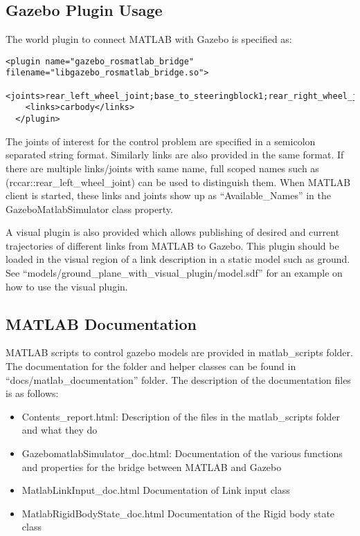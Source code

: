 \documentclass[letterpaper,10pt]{article}
\begin{document}
\subsection{Gazebo Plugin Usage}
The world plugin to connect MATLAB with Gazebo is specified as:
\small
\begin{Verbatim}[frame=single]
 <plugin name="gazebo_rosmatlab_bridge" filename="libgazebo_rosmatlab_bridge.so">
    <joints>rear_left_wheel_joint;base_to_steeringblock1;rear_right_wheel_joint</joints>
    <links>carbody</links>
  </plugin>
\end{Verbatim}
\normalsize
The joints of interest for the control problem are specified in a semicolon separated string format. Similarly links are also provided in the same format. If there are multiple links/joints with same name, full scoped names such as (rccar::rear\_left\_wheel\_joint) can be used to distinguish them. When MATLAB client is started, these links and joints show up as ``Available\_Names'' in the GazeboMatlabSimulator class property.

A visual plugin is also provided which allows publishing of desired and current trajectories of different links from MATLAB to Gazebo. This plugin should be loaded in the visual region of a link description in a static model such as ground. See ``models/ground\_plane\_with\_visual\_plugin/model.sdf'' for an example on how to use the visual plugin.

\subsection{MATLAB Documentation}
MATLAB scripts to control gazebo models are provided in matlab\_scripts folder. The documentation for the folder and helper classes can be found in ``docs/matlab\_documentation'' folder.
The description of the documentation files is as follows:
\begin{itemize}
 \item Contents\_report.html:	Description of the files in the matlab\_scripts folder and what they do
 \item GazebomatlabSimulator\_doc.html:	Documentation of the various functions and properties for the bridge between MATLAB and Gazebo
 \item MatlabLinkInput\_doc.html		Documentation of Link input class
 \item MatlabRigidBodyState\_doc.html	Documentation of the Rigid body state class
\end{itemize}
\end{document}
